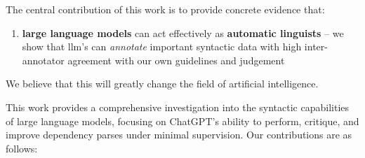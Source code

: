 \label{sec:contributions}
The central contribution of this work is to provide concrete evidence that:
\begin{enumerate}
    \item {\bf large language models} can act effectively as {\bf automatic linguists} -- we show that llm's can {\em annotate} important syntactic data with high inter-annotator agreement with our own guidelines and judgement
\end{enumerate}
We believe that this will greatly change the field of artificial intelligence.




This work provides a comprehensive investigation into the syntactic capabilities of large language models, focusing on ChatGPT’s ability to perform, critique, and improve dependency parses under minimal supervision. Our contributions are as follows:


